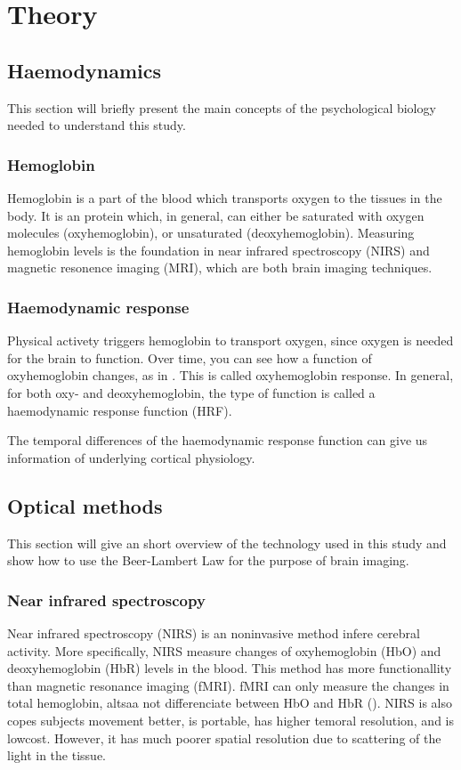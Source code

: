 \section{Theory}

\subsection{Haemodynamics} \label{sec:haemodynamics}
This section will briefly present the main concepts of the psychological biology needed to understand this study.

\subsubsection{Hemoglobin}
Hemoglobin is a part of the blood which transports oxygen to the tissues in the body. It is an protein which, in general, can either be saturated with oxygen molecules (oxyhemoglobin), or unsaturated (deoxyhemoglobin). Measuring hemoglobin levels is the foundation in near infrared spectroscopy (NIRS) and magnetic resonence imaging (MRI), which are both brain imaging techniques\cite{Carter20101}.

\subsubsection{Haemodynamic response}
Physical activety triggers hemoglobin to transport oxygen, since oxygen is needed for the brain to function. Over time, you can see how a function of oxyhemoglobin changes, as in  . This is called oxyhemoglobin response. In general, for both oxy- and deoxyhemoglobin, the type of function is called a haemodynamic response function (HRF). 

The temporal differences of the haemodynamic response function can give us information of underlying cortical physiology\cite{Haigh2015379}. 


\subsection{Optical methods} \label{sec:opticalMethods}
This section will give an short overview of the technology used in this study and show how to use the Beer-Lambert Law for the purpose of brain imaging.

\subsubsection{Near infrared spectroscopy} \label{sec:NIRS}
Near infrared spectroscopy (NIRS) is an noninvasive method infere cerebral activity. More specifically, NIRS measure changes of oxyhemoglobin (HbO) and deoxyhemoglobin (HbR) levels in the blood\cite{villringer1993near}. This method has more functionallity than magnetic resonance imaging (fMRI)\cite{HomER}. fMRI can only measure the changes in total hemoglobin, altsaa not differenciate between HbO and HbR (). NIRS is also copes subjects movement better, is portable, has higher temoral resolution, and is lowcost. However, it has much poorer spatial resolution due to scattering of the light in the tissue\cite{zhang2007imaging}.

